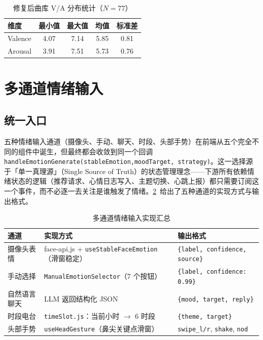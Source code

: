 \begin{table}[!htb]
  \centering
  \caption{修复后曲库 V/A 分布统计（$N=77$）}\label{tab:va-distribution}
  \begin{tabular*}{\linewidth}{@{\extracolsep{\fill}}lcccc}
    \toprule
    \textbf{维度} & \textbf{最小值} & \textbf{最大值} & \textbf{均值} & \textbf{标准差} \\
    \midrule
    Valence & 4.07 & 7.14 & 5.85 & 0.81 \\
    Arousal & 3.91 & 7.51 & 5.73 & 0.76 \\
    \bottomrule
  \end{tabular*}
\end{table}

\section{多通道情绪输入}

\subsection{统一入口}

五种情绪输入通道（摄像头、手动、聊天、时段、头部手势）在前端从五个完全不同的组件中诞生，但最终都会收敛到同一个回调 \texttt{\small handleEmotionGenerate(stableEmotion,\linebreak[1] moodTarget, strategy)}。这一选择源于「单一真理源」（Single Source of Truth）的状态管理理念——下游所有依赖情绪状态的逻辑（推荐请求、心情日志写入、主题切换、心跳上报）都只需要订阅这一个事件，而不必逐一去关注是谁触发了情绪。\cref{tab:channel}~给出了五种通道的实现方式与输出格式。

\begin{table}[!htb]
  \centering
  \caption{多通道情绪输入实现汇总}\label{tab:channel}
  \begin{tabularx}{\linewidth}{lXX}
    \toprule
    \textbf{通道} & \textbf{实现方式} & \textbf{输出格式} \\
    \midrule
    摄像头表情     & face-api.js + \texttt{useStableFaceEmotion}（滑窗稳定） & \texttt{\{label, confidence, source\}} \\
    手动选择       & \texttt{ManualEmotionSelector}（7 个按钮）             & \texttt{\{label, confidence:\,0.99\}} \\
    自然语言聊天   & LLM 返回结构化 JSON                                    & \texttt{\{mood, target, reply\}} \\
    时段电台       & \texttt{timeSlot.js}：当前小时 $\to$ 6 时段            & \texttt{\{theme, target\}} \\
    头部手势       & \texttt{useHeadGesture}（鼻尖关键点滑窗）              & \texttt{swipe\_l/r}, \texttt{shake}, \texttt{nod} \\
    \bottomrule
  \end{tabularx}
\end{table}

